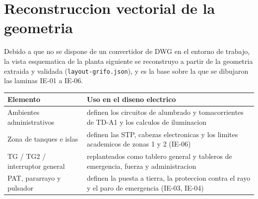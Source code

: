 \section{Reconstruccion vectorial de la geometria}
Debido a que no se dispone de un convertidor de DWG en el entorno de trabajo,
la vista esquematica de la planta siguiente se reconstruyo a partir de la
geometria extraida y validada (\texttt{layout-grifo.json}), y es la base sobre
la que se dibujaron las laminas IE-01 a IE-06.

\IlustracionLayout

\begin{center}
\small
\begin{tabularx}{\linewidth}{@{}l X@{}}
\toprule
Elemento & Uso en el diseno electrico \\
\midrule
Ambientes administrativos & definen los circuitos de alumbrado y
  tomacorrientes de TD-A1 y los calculos de iluminacion \\
Zona de tanques e islas & definen las STP, cabezas electronicas y los limites
  academicos de zonas 1 y 2 (IE-06) \\
TG / TG2 / interruptor general & replanteados como tablero general y tableros
  de emergencia, fuerza y administracion \\
PAT, pararrayo y pulsador & definen la puesta a tierra, la proteccion contra
  el rayo y el paro de emergencia (IE-03, IE-04) \\
\bottomrule
\end{tabularx}
\end{center}
